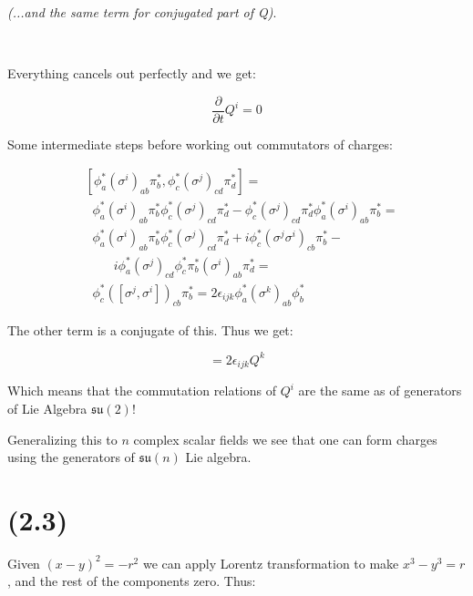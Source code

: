 \documentclass[11pt]{article}
\begin{document}
\textit{(...and the same term for conjugated part of Q)}.

\

Everything cancels out perfectly and we get:

\begin{equation}
\frac{\partial}{\partial t} Q^i = 0
\end{equation}

Some intermediate steps before working out commutators of charges:

\begin{equation}
\begin{split}
& [ \phi^*_a \left(\sigma^i\right)_{ab} \pi^*_b,
  \phi^*_c \left(\sigma^j\right)_{cd} \pi^*_d ] = \\
& \; \; \phi^*_a \left(\sigma^i\right)_{ab} \pi^*_b
    \phi^*_c \left(\sigma^j\right)_{cd} \pi^*_d -
  \phi^*_c \left(\sigma^j\right)_{cd} \pi^*_d
    \phi^*_a \left(\sigma^i\right)_{ab} \pi^*_b = \\
& \; \; \phi^*_a \left(\sigma^i\right)_{ab} \pi^*_b
    \phi^*_c \left(\sigma^j\right)_{cd} \pi^*_d +
    i \phi^*_c \left(\sigma^j \sigma^i\right)_{cb} \pi^*_b - \\
& \; \; \; \; \; \; \; \;
    i \phi^*_a \left(\sigma^j\right)_{cd} \phi^*_c \pi^*_b
      \left(\sigma^i\right)_{ab} \pi^*_d = \\
& \; \;
   \phi^*_c \left([ \sigma^j , \sigma^i ]\right)_{cb} \pi^*_b =
   2 \epsilon_{ijk} \phi^*_a \left(\sigma^k\right)_{ab} \phi^*_b
\end{split}
\end{equation}

The other term is a conjugate of this. Thus we get:

\begin{equation}
[ Q^i, Q^j] = 2 \epsilon_{ijk} Q^k
\end{equation}

Which means that the commutation relations of $Q^i$ are the same as of
generators of Lie Algebra $\mathfrak{su}(2)$!

Generalizing this to $n$ complex scalar fields we see that one can
form charges using the generators of $\mathfrak{su}(n)$ Lie algebra.

\section*{(2.3)} 

Given $(x - y)^2 = -r^2$ we can apply Lorentz transformation to make
\hfill\break $x^3 - y^3 = r$, and the rest of the components zero.
Thus:
\end{document}
